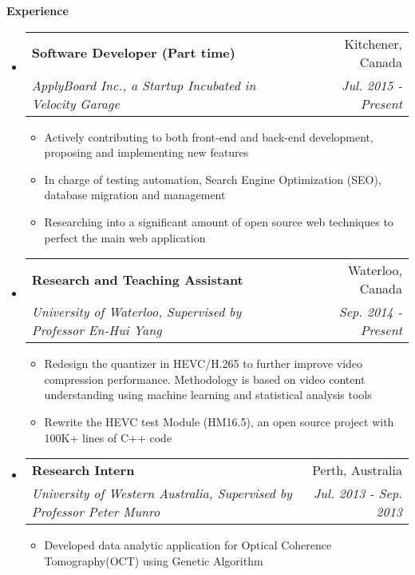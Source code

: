 \documentclass[letterpaper,10pt]{article}
\makeatletter
\newcommand{\resitem}[1]{\item #1 \vspace{-2pt}}
\newcommand{\resheading}[1]{{\large \colorbox{mygrey}{\begin{minipage}{\textwidth}{\textbf{#1 \vphantom{p\^{E}}}}\end{minipage}}}}
\newcommand{\ressubheading}[4]{
\begin{tabular*}{7.0in}{l@{\extracolsep{\fill}}r}
		\textbf{#1} & #2 \\
		\textit{#3} & \textit{#4} \\
\end{tabular*}\vspace{-6pt}}
\makeatother
\begin{document}
\resheading{Experience}
\begin{itemize}
\itemsep0em
\item
	\ressubheading{Software Developer (Part time)}{Kitchener, Canada}{ApplyBoard Inc., a Startup Incubated in Velocity Garage}{ Jul. 2015 - Present}
	\begin{itemize}
		\resitem{Actively contributing to both front-end and back-end development, proposing and implementing new features}
		\resitem{In charge of testing automation, Search Engine Optimization (SEO), database migration and management}
		\resitem{Researching into a significant amount of open source web techniques to perfect the main web application}
	\end{itemize}
\item
	\ressubheading{Research and Teaching Assistant}{Waterloo, Canada}{University of Waterloo, Supervised by Professor En-Hui Yang}{Sep. 2014 - Present}
	\begin{itemize}
		\resitem{Redesign the quantizer in HEVC/H.265 to further improve video compression performance. Methodology is based on video content understanding using machine learning and statistical analysis tools}
		\resitem{Rewrite the HEVC test Module (HM16.5), an open source project with 100K+ lines of C++ code}
	\end{itemize}
\item
	\ressubheading{Research Intern}{Perth, Australia}{University of Western Australia, Supervised by Professor Peter Munro}{Jul. 2013 - Sep. 2013}
	\begin{itemize}
		\resitem{Developed data analytic application for Optical Coherence Tomography(OCT) using Genetic Algorithm }
	\end{itemize}
\end{itemize}
\end{document}

